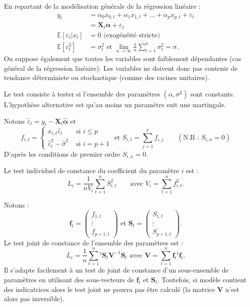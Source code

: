 \documentclass[
  a4paper,
  DIV=11,
  numbers=noendperiod,
  french]{scrartcl}
\newcommand\1{{\mathds 1}}
\newcommand{\transp}[1]{{}^t\!#1}
\newcommand{\bf}[1]{{\boldsymbol #1}}
\newcommand{\E}[1]{\mathbb{E}\left[#1\right]}
\theoremstyle{remark}
\begin{document}
En repartant de la modélisation générale de la régression linéaire :
\begin{align*}
y_t&=\alpha_{0}x_{0,t}+\alpha_{1} x_{1,t}+\dots+\alpha_{p} x_{p,t} +\varepsilon_t  \\
&= {\bf X_t} \bf\alpha  +\varepsilon_t\\
\E{\varepsilon_t|x_t}&=0 \text{ (exogénéité stricte)} \\
\E{\varepsilon_t^2}&=\sigma_t^2\text{ et } \underset{n\to\infty}{\lim}\frac{1}{n}\sum_{t=1}^n\sigma_t^2=\sigma.
\end{align*} On suppose également que toutes les variables sont
faiblement dépendantes (cas général de la régression linéaire). Les
variables ne doivent donc pas contenir de tendance déterministe ou
stochastique (comme des racines unitaires).

Le test consiste à tester si l'ensemble des paramètres
\((\alpha,\sigma^2)\) sont constants. L'hypothèse alternative est qu'au
moins un paramètre suit une martingale.

Notons \({\hat \varepsilon}_t =y_t- {\bf X_t} \hat{\bf\alpha}\) et \[
f_{i,t} = \begin{cases}
x_{i,t}\hat \varepsilon_t &\text{ si }i\leq p\\
\hat \varepsilon_t^2 - \hat \sigma^2&\text{ si }i=p+1
\end{cases}
\text{ et }S_{i,t} = \sum_{j=1}^tf_{i,j}\qquad(\text{N.B : }S_{i,n}=0)
\] D'après les conditions de premier ordre \(S_{i,n}=0.\)

Le test individuel de constance du coefficient du paramètre \(i\) est :
\[
L_i=\frac{1}{nV_i}\sum_{t=1}^nS_{i,t}^2\qquad
\text{avec }V_i=\sum_{t=1}^nf_{i,t}^2.
\]

Notons : \[
\bf f_t= \begin{pmatrix}
f_{1,t} \\ \vdots \\ f_{p+1,t}
\end{pmatrix} \text{ et }
\bf S_t= \begin{pmatrix}
S_{1,t} \\ \vdots \\ S_{p+1,t}
\end{pmatrix}.
\] Le test joint de constance de l'ensemble des paramètres est : \[
L_c = \frac{1}{n}
\sum_{t=1}^n\transp{\bf S_t}\bf V^{-1}\bf S_t
\text{ avec }\bf V=\sum_{t=1}^n\bf f_{t}\transp{\bf f_{t}}.
\] Il s'adapte facilement à un test de joint de constance d'un
sous-ensemble de paramètres en utilisant des sous-vecteurs de
\(\bf f_t\) et \(\bf S_t.\) Toutefois, si modèle contient des
indicatrices alors le test joint ne pourra pas être calculé (la matrice
\(\bf V\) n'est alors pas inversible).
\end{document}
